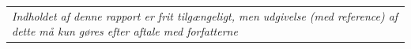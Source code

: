 \begin{table}[b]
    \centering
    \begin{tabular}{m{\linewidth}}
         \textit{Indholdet af denne rapport er frit tilgængeligt, men udgivelse (med reference) af dette må kun gøres efter aftale med forfatterne}
    \end{tabular}
\end{table}

\thispagestyle{empty}